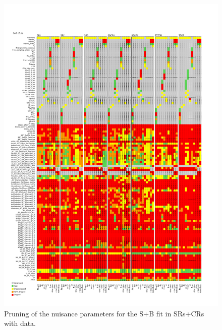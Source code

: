 \begin{figure}[htbp]
	\centering
	\includegraphics[width=.85\textwidth]{Chapters/CH8/figures/SPLUSB_CRSR_DL1rc_unblind/Pruning}
	\caption{Pruning of the nuisance parameters for the S+B \tZc fit in SRs+CRs with data.}%
	\label{fig:stat:tzc:splusb:crsr:pruning_unb}
\end{figure}

